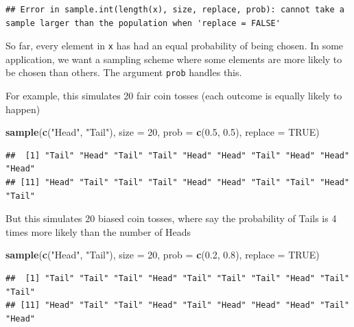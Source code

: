 \documentclass[]{book}
\newenvironment{Shaded}{\begin{snugshade}}{\end{snugshade}}
\newcommand{\DataTypeTok}[1]{\textcolor[rgb]{0.13,0.29,0.53}{#1}}
\newcommand{\DecValTok}[1]{\textcolor[rgb]{0.00,0.00,0.81}{#1}}
\newcommand{\FloatTok}[1]{\textcolor[rgb]{0.00,0.00,0.81}{#1}}
\newcommand{\KeywordTok}[1]{\textcolor[rgb]{0.13,0.29,0.53}{\textbf{#1}}}
\newcommand{\NormalTok}[1]{#1}
\newcommand{\OtherTok}[1]{\textcolor[rgb]{0.56,0.35,0.01}{#1}}
\newcommand{\StringTok}[1]{\textcolor[rgb]{0.31,0.60,0.02}{#1}}
\theoremstyle{definition}
\theoremstyle{definition}
\theoremstyle{definition}
\theoremstyle{remark}
\begin{document}
\begin{verbatim}
## Error in sample.int(length(x), size, replace, prob): cannot take a sample larger than the population when 'replace = FALSE'
\end{verbatim}

So far, every element in \texttt{x} has had an equal probability of being chosen. In some application, we want a sampling scheme where some elements are more likely to be chosen than others. The argument \texttt{prob} handles this.

For example, this simulates 20 fair coin tosses (each outcome is equally likely to happen)

\begin{Shaded}
\begin{Highlighting}[]
\KeywordTok{sample}\NormalTok{(}\KeywordTok{c}\NormalTok{(}\StringTok{"Head"}\NormalTok{, }\StringTok{"Tail"}\NormalTok{), }\DataTypeTok{size =} \DecValTok{20}\NormalTok{, }\DataTypeTok{prob =} \KeywordTok{c}\NormalTok{(}\FloatTok{0.5}\NormalTok{, }\FloatTok{0.5}\NormalTok{), }\DataTypeTok{replace =} \OtherTok{TRUE}\NormalTok{)}
\end{Highlighting}
\end{Shaded}

\begin{verbatim}
##  [1] "Tail" "Head" "Tail" "Tail" "Head" "Head" "Tail" "Head" "Head" "Head"
## [11] "Head" "Tail" "Tail" "Tail" "Head" "Head" "Tail" "Tail" "Head" "Tail"
\end{verbatim}

But this simulates 20 biased coin tosses, where say the probability of Tails is 4 times more likely than the number of Heads

\begin{Shaded}
\begin{Highlighting}[]
\KeywordTok{sample}\NormalTok{(}\KeywordTok{c}\NormalTok{(}\StringTok{"Head"}\NormalTok{, }\StringTok{"Tail"}\NormalTok{), }\DataTypeTok{size =} \DecValTok{20}\NormalTok{, }\DataTypeTok{prob =} \KeywordTok{c}\NormalTok{(}\FloatTok{0.2}\NormalTok{, }\FloatTok{0.8}\NormalTok{), }\DataTypeTok{replace =} \OtherTok{TRUE}\NormalTok{)}
\end{Highlighting}
\end{Shaded}

\begin{verbatim}
##  [1] "Tail" "Tail" "Tail" "Head" "Tail" "Tail" "Tail" "Head" "Tail" "Tail"
## [11] "Head" "Tail" "Tail" "Head" "Tail" "Head" "Head" "Head" "Tail" "Head"
\end{verbatim}
\end{document}
